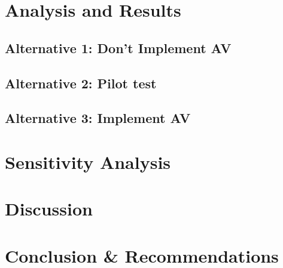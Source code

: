 \documentclass[11pt, letterpaper]{article}
\begin{document}
\section{Analysis and Results} \label{results}


\subsection{Alternative 1: Don't Implement AV}

\subsection{Alternative 2: Pilot test}

\subsection{Alternative 3: Implement AV}

\section{Sensitivity Analysis} \label{sensitivity}




\section{Discussion} \label{discussion}


\section{Conclusion \& Recommendations} \label{conclusion}

\end{document}
